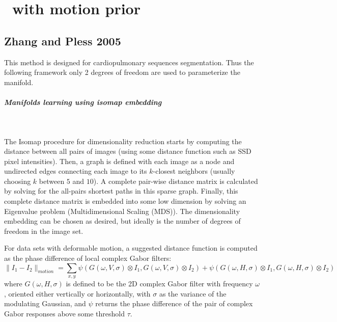 
\newpage
\chapter{\Ls~with motion prior}
\label{chap:mvt}

\section[Zhang and Pless]{Zhang and Pless 2005 \cite{Zhang2005}}
\label{sec:motion-zhang}

This method is designed for cardiopulmonary sequences segmentation. Thus the following framework only 2 degrees of freedom are used to parameterize the manifold.

\paragraph{Manifolds learning using isomap embedding}
~\par \vspace{0.3cm}
The Isomap procedure for dimensionality reduction starts by computing the distance between all pairs of images (using some distance function such as SSD pixel intensities). Then, a graph is defined with each image as a node and undirected edges connecting each image to its $k$-closest neighbors (usually choosing $k$ between $5$ and $10$). A complete pair-wise distance matrix is calculated by solving for the all-pairs shortest paths in this sparse graph. Finally, this complete distance matrix is embedded into some low dimension by solving an Eigenvalue problem (Multidimensional Scaling (MDS)). The dimensionality embedding can be chosen as desired, but ideally is the number of degrees of freedom in the image set.

For data sets with deformable motion, a suggested distance function is computed as the phase difference of local complex Gabor filters:
\begin{equation}
  \label{eq:local_Gabor_filter_zhang}
  \|I_1 - I_2 \|_{motion} = \sum_{x,y} { \psi(G(\omega, V, \sigma) \otimes I_1, G(\omega, V, \sigma) \otimes I_2) + \psi(G(\omega, H, \sigma) \otimes I_1, G(\omega, H, \sigma) \otimes I_2) }
\end{equation}
where $G(\omega, H, \sigma)$ is defined to be the 2D complex Gabor filter with frequency $\omega$, oriented either vertically or horizontally, with $\sigma$ as the variance of the modulating Gaussian, and $\psi$ returns the phase difference of the pair of complex Gabor responses above some threshold $\tau$.



